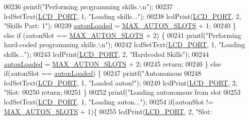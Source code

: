 \begin{DoxyCode}
{{{{{{{{{{{{{{{{{{{{{{{{00236             printf(\textcolor{stringliteral}{"Performing programming skills.\(\backslash\)n"});
00237             lcdSetText(\hyperlink{lcdmsg_8h_abcf42bd88b3c36193f301ca25b033875}{LCD\_PORT}, 1, \textcolor{stringliteral}{"Loading skills..."});
00238             lcdPrint(\hyperlink{lcdmsg_8h_abcf42bd88b3c36193f301ca25b033875}{LCD\_PORT},   2, \textcolor{stringliteral}{"Skills Part: 1"});
00239             \hyperlink{autonrecorder_8c_a4e72d907ee74449b71b5e20943f4217e}{autonLoaded} = \hyperlink{autonrecorder_8h_a5173a11a545cb4020fdd139552dc15c1}{MAX\_AUTON\_SLOTS} + 1;
00240         \} \textcolor{keywordflow}{else} \textcolor{keywordflow}{if} (autonSlot == \hyperlink{autonrecorder_8h_a5173a11a545cb4020fdd139552dc15c1}{MAX\_AUTON\_SLOTS} + 2) \{
00241             printf(\textcolor{stringliteral}{"Performing hard-coded programming skills.\(\backslash\)n"});
00242             lcdSetText(\hyperlink{lcdmsg_8h_abcf42bd88b3c36193f301ca25b033875}{LCD\_PORT}, 1, \textcolor{stringliteral}{"Loading skills..."});
00243             lcdPrint(\hyperlink{lcdmsg_8h_abcf42bd88b3c36193f301ca25b033875}{LCD\_PORT},   2, \textcolor{stringliteral}{"Hardcoded Skills"});
00244             \hyperlink{autonrecorder_8c_a4e72d907ee74449b71b5e20943f4217e}{autonLoaded} = \hyperlink{autonrecorder_8h_a5173a11a545cb4020fdd139552dc15c1}{MAX\_AUTON\_SLOTS} + 2;
00245             \textcolor{keywordflow}{return};
00246         \} \textcolor{keywordflow}{else} \textcolor{keywordflow}{if}(autonSlot == \hyperlink{autonrecorder_8c_a4e72d907ee74449b71b5e20943f4217e}{autonLoaded}) \{
00247             printf(\textcolor{stringliteral}{"Autonomous %
00248             lcdSetText(\hyperlink{lcdmsg_8h_abcf42bd88b3c36193f301ca25b033875}{LCD\_PORT}, 1, \textcolor{stringliteral}{"Loaded auton!"});
00249             lcdPrint(\hyperlink{lcdmsg_8h_abcf42bd88b3c36193f301ca25b033875}{LCD\_PORT},   2, \textcolor{stringliteral}{"Slot: %
00250             \textcolor{keywordflow}{return};
00251         \}
00252         printf(\textcolor{stringliteral}{"Loading autonomous from slot %
00253         lcdSetText(\hyperlink{lcdmsg_8h_abcf42bd88b3c36193f301ca25b033875}{LCD\_PORT}, 1, \textcolor{stringliteral}{"Loading auton..."});
00254         \textcolor{keywordflow}{if}(autonSlot != \hyperlink{autonrecorder_8h_a5173a11a545cb4020fdd139552dc15c1}{MAX\_AUTON\_SLOTS} + 1)\{
00255             lcdPrint(\hyperlink{lcdmsg_8h_abcf42bd88b3c36193f301ca25b033875}{LCD\_PORT}, 2,   \textcolor{stringliteral}{"Slot: %
}}}}}}}}}}}}}}}}}}}}}}}}}}}}
\end{DoxyCode}
